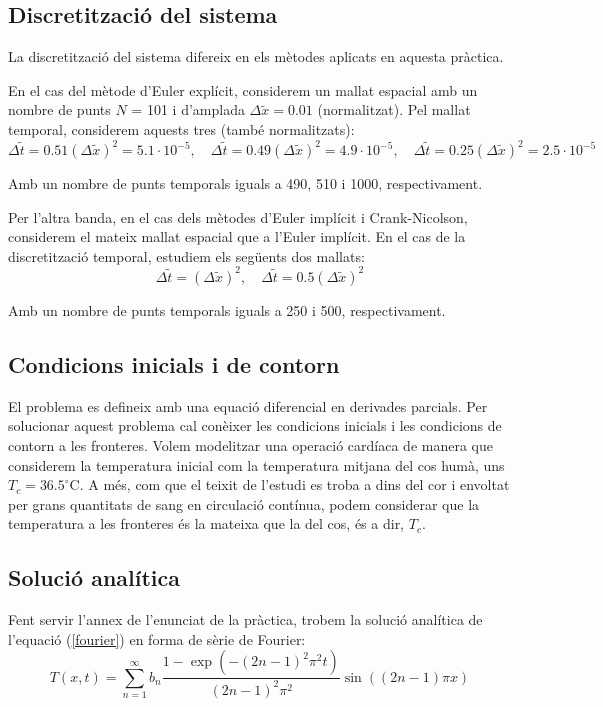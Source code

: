 \documentclass[a4paper,11pt,oneside]{article}
\begin{document}
\subsection{Discretització del sistema}

La discretització del sistema difereix en els mètodes aplicats en aquesta pràctica.

En el cas del mètode d'Euler explícit, considerem un mallat espacial amb un nombre de punts $N$ = 101 i d'amplada $\Delta \widetilde{x} = 0.01$ (normalitzat). 
Pel mallat temporal, considerem aquests tres (també normalitzats):
\begin{equation*}
    \Delta \widetilde{t} = 0.51 (\Delta \widetilde{x})^2 = 5.1 \cdot 10^{-5}, \quad \Delta \widetilde{t} = 0.49 (\Delta \widetilde{x})^2 = 4.9 \cdot 10^{-5}, \quad \Delta \widetilde{t} = 0.25 (\Delta \widetilde{x})^2 = 2.5 \cdot 10^{-5}
\end{equation*}

Amb un nombre de punts temporals iguals a 490, 510 i 1000, respectivament.

Per l'altra banda, en el cas dels mètodes d'Euler implícit i Crank-Nicolson, considerem el mateix mallat espacial que a l'Euler 
implícit. En el cas de la discretització temporal, estudiem els següents dos mallats:
\begin{equation*}
    \Delta \widetilde{t} = (\Delta \widetilde{x})^2, \quad \Delta \widetilde{t} = 0.5 (\Delta \widetilde{x})^2
\end{equation*}

Amb un nombre de punts temporals iguals a 250 i 500, respectivament.

\subsection{Condicions inicials i de contorn}

El problema es defineix amb una equació diferencial en derivades parcials. Per solucionar aquest problema cal conèixer les condicions 
inicials i les condicions de contorn a les fronteres. Volem modelitzar una operació cardíaca de manera que considerem la temperatura 
inicial com la temperatura mitjana del cos humà, uns $T_c = 36.5 ^\circ$C. A més, com que el teixit de l'estudi es troba a dins 
del cor i envoltat per grans quantitats de sang en circulació contínua, podem considerar que la temperatura a les fronteres és 
la mateixa que la del cos, és a dir, $T_c$.


\subsection{Solució analítica}
Fent servir l'annex de l'enunciat de la pràctica, trobem la solució analítica de l'equació (\ref{fourier}) en forma de sèrie de 
Fourier:
\begin{equation}
    T(x,t)=\sum_{n=1}^{\infty} b_n \frac{1-\exp\left(-(2n-1)^2\pi^2t\right)}{(2n-1)^2\pi^2}\sin\left((2n-1)\pi x\right)
\end{equation}
\end{document}
